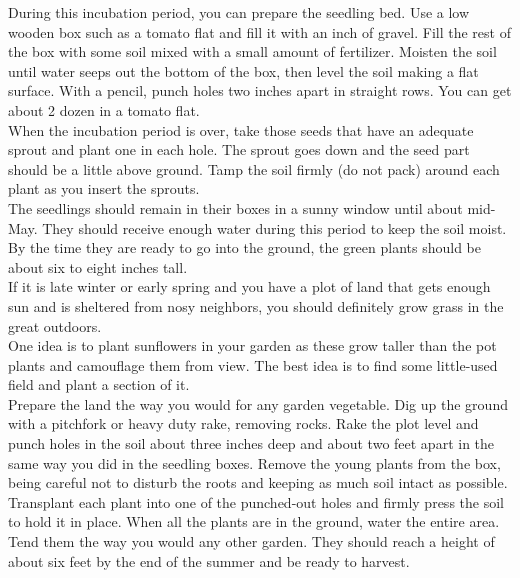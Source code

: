 \documentclass[11pt,twoside,a4paper]{book}
\begin{document}
During this incubation period, you can prepare the seedling bed. Use a low wooden box such as a tomato flat and fill it with an inch of gravel. Fill the rest of the box with some soil mixed with a small amount of fertilizer. Moisten the soil until water seeps out the bottom of the box, then level the soil making a flat surface. With a pencil, punch holes two inches apart in straight rows. You can get about 2 dozen in a tomato flat.~\\

When the incubation period is over, take those seeds that have an adequate sprout and plant one in each hole. The sprout goes down and the seed part should be a little above ground. Tamp the soil firmly (do not pack) around each plant as you insert the sprouts.~\\

The seedlings should remain in their boxes in a sunny window until about mid-May. They should receive enough water during this period to keep the soil moist. By the time they are ready to go into the ground, the green plants should be about six to eight inches tall.~\\

If it is late winter or early spring and you have a plot of land that gets enough sun and is sheltered from nosy neighbors, you should definitely grow grass in the great outdoors.~\\

One idea is to plant sunflowers in your garden as these grow taller than the pot plants and camouflage them from view. The best idea is to find some little-used field and plant a section of it.~\\

Prepare the land the way you would for any garden vegetable. Dig up the ground with a pitchfork or heavy duty rake, removing rocks. Rake the plot level and punch holes in the soil about three inches deep and about two feet apart in the same way you did in the seedling boxes. Remove the young plants from the box, being careful not to disturb the roots and keeping as much soil intact as possible. Transplant each plant into one of the punched-out holes and firmly press the soil to hold it in place. When all the plants are in the ground, water the entire area. Tend them the way you would any other garden. They should reach a height of about six feet by the end of the summer and be ready to harvest.~\\
\end{document}
